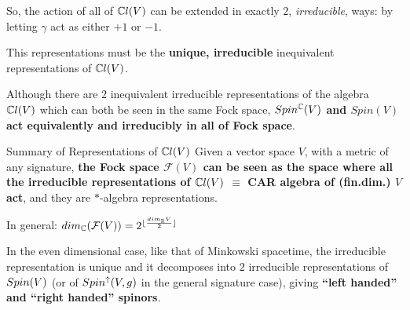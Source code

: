 \begin{frame} %
    So, the action of all of $\mathbb C l(V)$ can be extended in exactly $2$, \emph{irreducible}, ways: by letting $\gamma$ act as either $+1$ or $-1$. 
    
    This representations must be the \textbf{unique, irreducible} inequivalent representations of $\mathbb C l(V)$.    
    
    Although there are $2$ inequivalent irreducible representations of the algebra $\mathbb C l(V)$ which can both be seen in the same Fock space, \textbf{$Spin^\mathbb C(V)$ and $Spin(V)$ act equivalently and irreducibly in all of Fock space}.
    
\end{frame}

\begin{frame}{Summary of Representations of $\mathbb C l(V)$} %
    Given a vector space $V$, with a metric of any signature, \textbf{the Fock space $\mathcal F(V)$ can be seen as the space where all the irreducible representations of $\mathbb C l(V)$ $\equiv$ CAR algebra of (fin.dim.) $V$  act}, and they are $*$-algebra representations.

    In general: $dim_\mathbb C (\mathcal F(V)) = 2^{\lfloor\frac{dim_\mathbb R V}{2} \rfloor}$
    
    In the even dimensional case, like that of Minkowski spacetime, the irreducible representation is unique and it decomposes into $2$ irreducible representations of $Spin(V)$ (or of $Spin^\uparrow(V, g)$ in the general signature case), giving \textbf{``left handed'' and ``right handed'' spinors}. %
\end{frame}